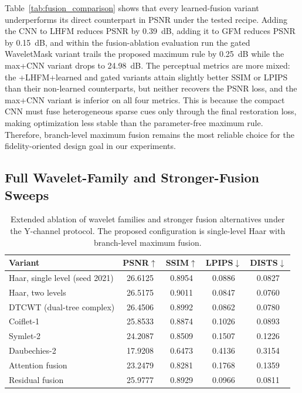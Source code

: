 \documentclass[applsci,article,submit,pdftex,moreauthors]{Definitions/mdpi}
\begin{document}
Table~\ref{tab:fusion_comparison} shows that every learned-fusion variant underperforms its direct counterpart in PSNR under the tested recipe. Adding the CNN to LHFM reduces PSNR by 0.39~dB, adding it to GFM reduces PSNR by 0.15~dB, and within the fusion-ablation evaluation run the gated WaveletMask variant trails the proposed maximum rule by 0.25~dB while the max+CNN variant drops to 24.98~dB. The perceptual metrics are more mixed: the +LHFM+learned and gated variants attain slightly better SSIM or LPIPS than their non-learned counterparts, but neither recovers the PSNR loss, and the max+CNN variant is inferior on all four metrics. This is because the compact CNN must fuse heterogeneous sparse cues only through the final restoration loss, making optimization less stable than the parameter-free maximum rule. Therefore, branch-level maximum fusion remains the most reliable choice for the fidelity-oriented design goal in our experiments.

\subsection{Full Wavelet-Family and Stronger-Fusion Sweeps}\label{subsec:wavelet_family_analysis}

\begin{table}[H]
\caption{Extended ablation of wavelet families and stronger fusion alternatives under the Y-channel protocol. The proposed configuration is single-level Haar with branch-level maximum fusion.\label{tab:followup_ablations}}
\footnotesize
\begin{tabularx}{\textwidth}{lCCCC}
\toprule
\textbf{Variant} & \textbf{PSNR$\uparrow$} & \textbf{SSIM$\uparrow$} & \textbf{LPIPS$\downarrow$} & \textbf{DISTS$\downarrow$} \\
\midrule
Haar, single level (seed 2021) & 26.6125 & 0.8954 & 0.0886 & 0.0827 \\
Haar, two levels & 26.5175 & 0.9011 & 0.0847 & 0.0760 \\
DTCWT (dual-tree complex) & 26.4506 & 0.8992 & 0.0862 & 0.0780 \\
Coiflet-1 & 25.8533 & 0.8874 & 0.1026 & 0.0893 \\
Symlet-2 & 24.2087 & 0.8509 & 0.1507 & 0.1226 \\
Daubechies-2 & 17.9208 & 0.6473 & 0.4136 & 0.3154 \\
\midrule
Attention fusion & 23.2479 & 0.8281 & 0.1768 & 0.1359 \\
Residual fusion & 25.9777 & 0.8929 & 0.0966 & 0.0811 \\
\bottomrule
\end{tabularx}
\normalsize
\end{table}
\end{document}
